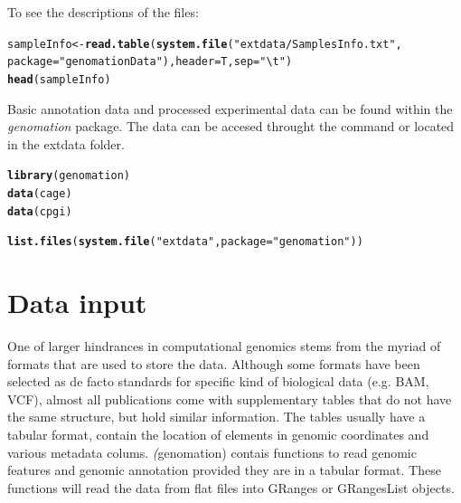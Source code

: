 \documentclass{article}\usepackage[]{graphicx}\usepackage[]{color}
\makeatletter
\newcommand{\hlstr}[1]{\textcolor[rgb]{0.192,0.494,0.8}{#1}}%
\newcommand{\hlstd}[1]{\textcolor[rgb]{0.345,0.345,0.345}{#1}}%
\newcommand{\hlkwb}[1]{\textcolor[rgb]{0.69,0.353,0.396}{#1}}%
\newcommand{\hlkwc}[1]{\textcolor[rgb]{0.333,0.667,0.333}{#1}}%
\newcommand{\hlkwd}[1]{\textcolor[rgb]{0.737,0.353,0.396}{\textbf{#1}}}%
\newenvironment{kframe}{%
 \def\at@end@of@kframe{}%
 \ifinner\ifhmode%
  \def\at@end@of@kframe{\end{minipage}}%
  \begin{minipage}{\columnwidth}%
 \fi\fi%
 \def\FrameCommand##1{\hskip\@totalleftmargin \hskip-\fboxsep
 \colorbox{shadecolor}{##1}\hskip-\fboxsep
     \hskip-\linewidth \hskip-\@totalleftmargin \hskip\columnwidth}%
 \MakeFramed {\advance\hsize-\width
   \@totalleftmargin\z@ \linewidth\hsize
   \@setminipage}}%
 {\par\unskip\endMakeFramed%
 \at@end@of@kframe}
\newenvironment{knitrout}{}{} %
\newcommand{\Rpackage}[1]{{\textit{#1}}}
\makeatother
\begin{document}
To see the descriptions of the files:
\begin{knitrout}
\color{fgcolor}\begin{kframe}
\begin{alltt}
\hlstd{sampleInfo} \hlkwb{<-} \hlkwd{read.table}\hlstd{(}\hlkwd{system.file}\hlstd{(}\hlstr{"extdata/SamplesInfo.txt"}\hlstd{,}
    \hlkwc{package} \hlstd{=} \hlstr{"genomationData"}\hlstd{),} \hlkwc{header} \hlstd{= T,} \hlkwc{sep} \hlstd{=} \hlstr{"\textbackslash{}t"}\hlstd{)}
\hlkwd{head}\hlstd{(sampleInfo)}
\end{alltt}
\end{kframe}
\end{knitrout}


Basic annotation data and processed experimental data can be found within the \Rpackage{genomation} package.
The data can be accesed throught the  command or located in the extdata folder. 
\begin{knitrout}
\color{fgcolor}\begin{kframe}
\begin{alltt}
\hlkwd{library}\hlstd{(genomation)}
\hlkwd{data}\hlstd{(cage)}
\hlkwd{data}\hlstd{(cpgi)}

\hlkwd{list.files}\hlstd{(}\hlkwd{system.file}\hlstd{(}\hlstr{"extdata"}\hlstd{,} \hlkwc{package} \hlstd{=} \hlstr{"genomation"}\hlstd{))}
\end{alltt}
\end{kframe}
\end{knitrout}




\section{Data input}

One of larger hindrances in computational genomics stems from the myriad of formats
that are used to store the data. Although some formats have been selected as de facto standards
for specific kind of biological data (e.g. BAM, VCF), 
almost all publications come with supplementary tables that do not have the same structure, 
but hold similar information. The tables usually have a tabular format, contain the location
of elements in genomic coordinates and various metadata colums. 
\Rpackage(genomation) contais functions to read genomic features and genomic annotation 
provided they are in a tabular format. These functions will read the data from 
flat files into GRanges or GRangesList objects.
\end{document}
